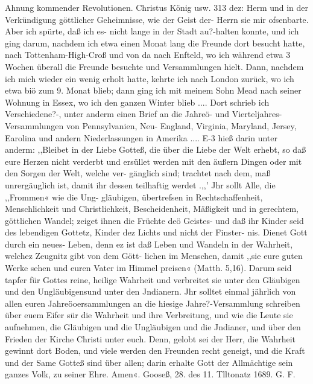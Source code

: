Ahnung kommender Revolutionen. Christus König usw. 313
dez: Herm und in der Verkündigung göttlicher Geheimnisse, wie
der Geist der- Herrn sie mir ofsenbarte. Aber ich spürte, daß ich
es- nicht lange in der Stadt au?-halten konnte, und ich ging darum,
nachdem ich etwa einen Monat lang die Freunde dort besucht
hatte, nach Tottenham-High-Croß und von da nach Enfteld, wo
ich während etwa 3 Wochen überall die Freunde besuchte und
Versammlungen hielt. Dann, nachdem ich mich wieder ein wenig
erholt hatte, kehrte ich nach London zurück, wo ich etwa biö zum
9. Monat blieb; dann ging ich mit meinem Sohn Mead nach
seiner Wohnung in Essex, wo ich den ganzen Winter blieb ....
Dort schrieb ich Verschiedene?-, unter anderm einen Brief an die
Jahreö- und Vierteljahres-Versammlungen von Pennsylvanien, Neu-
England, Virginia, Maryland, Jersey, Earolina und andern
Niederlassungen in Amerika .... E-3 hieß darin unter anderm:
,,Bleibet in der Liebe Gotteß, die über die Liebe der Welt
erhebt, so daß eure Herzen nicht verderbt und ersüllet werden mit
den äußern Dingen oder mit den Sorgen der Welt, welche ver-
gänglich sind; trachtet nach dem, maß unrergäuglich ist, damit ihr
dessen teilhaftig werdet .,,’ Jhr sollt Alle, die ,,Frommen« wie die Ung-
gläubigen, übertrefsen in Rechtschaffenheit, Menschlichkeit und
Christlichkeit, Bescheidenheit, Mäßigkeit und in gerechtem, göttlichen
Wandel; zeiget ihnen die Früchte deö Geistes- und daß ihr Kinder
seid des lebendigen Gottetz, Kinder dez Lichts und nicht der Finster-
nis. Dienet Gott durch ein neues- Leben, denn ez ist daß Leben und
Wandeln in der Wahrheit, welchez Zeugnitz gibt von dem Gött-
lichen im Menschen, damit ,,sie eure guten Werke sehen und euren
Vater im Himmel preisen« (Matth. 5,16). Darum seid tapfer für
Gottes reine, heilige Wahrheit und verbreitet sie unter den
Gläubigen und den Ungläubigensund unter den Jndianern. Jhr
solltet einmal jährlich von allen euren Jahreöoersammlungen an
die hiesige Jahre?-Versammlung schreiben über euem Eifer sür die
Wahrheit und ihre Verbreitung, und wie die Leute sie aufnehmen,
die Gläubigen und die Ungläubigen und die Jndianer, und über
den Frieden der Kirche Christi unter euch. Denn, gelobt sei der
Herr, die Wahrheit gewinnt dort Boden, und viele werden den
Freunden recht geneigt, und die Kraft und der Same Gotteß sind
über allen; darin erhalte Gott der Allmächtige sein ganzes Volk,
zu seiner Ehre. Amen«.
Gooseß, 28. des 11. Tlltonatz 1689. G. F.


